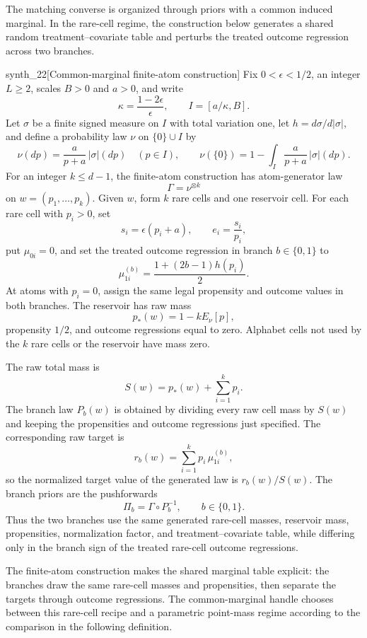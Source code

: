\documentclass[11pt]{article}
\begin{document}
The matching converse is organized through priors with a common induced marginal. In the rare-cell regime, the construction below generates a shared random treatment--covariate table and perturbs the treated outcome regression across two branches.

\begin{definitionv}{synth_22}[Common-marginal finite-atom construction]
Fix \(0<\epsilon<1/2\), an integer \(L\ge2\), scales \(B>0\) and \(a>0\), and write
\[
\kappa=\frac{1-2\epsilon}{\epsilon},\qquad I=[a/\kappa,B].
\]
Let \(\sigma\) be a finite signed measure on \(I\) with total variation one, let
\(h=d\sigma/d|\sigma|\), and define a probability law \(\nu\) on \(\{0\}\cup I\) by
\[
\nu(dp)=\frac{a}{p+a}\,|\sigma|(dp)\quad(p\in I),
\qquad
\nu(\{0\})=1-\int_I\frac{a}{p+a}\,|\sigma|(dp).
\]
For an integer \(k\le d-1\), the finite-atom construction has atom-generator law
\[
\Gamma=\nu^{\otimes k}
\]
on \(w=(p_1,\ldots,p_k)\).  Given \(w\), form \(k\) rare cells and one reservoir cell.  For each rare cell with \(p_i>0\), set
\[
s_i=\epsilon(p_i+a),\qquad e_i=\frac{s_i}{p_i},
\]
put \(\mu_{0i}=0\), and set the treated outcome regression in branch \(b\in\{0,1\}\) to
\[
\mu_{1i}^{(b)}=\frac{1+(2b-1)h(p_i)}{2}.
\]
At atoms with \(p_i=0\), assign the same legal propensity and outcome values in both branches.  The reservoir has raw mass
\[
p_*(w)=1-kE_\nu[p],
\]
propensity \(1/2\), and outcome regressions equal to zero.  Alphabet cells not used by the \(k\) rare cells or the reservoir have mass zero.

The raw total mass is
\[
S(w)=p_*(w)+\sum_{i=1}^k p_i.
\]
The branch law \(P_b(w)\) is obtained by dividing every raw cell mass by \(S(w)\) and keeping the propensities and outcome regressions just specified.  The corresponding raw target is
\[
r_b(w)=\sum_{i=1}^k p_i\,\mu_{1i}^{(b)},
\]
so the normalized target value of the generated law is \(r_b(w)/S(w)\).  The branch priors are the pushforwards
\[
\Pi_b=\Gamma\circ P_b^{-1},\qquad b\in\{0,1\}.
\]
Thus the two branches use the same generated rare-cell masses, reservoir mass, propensities, normalization factor, and treatment--covariate table, while differing only in the branch sign of the treated rare-cell outcome regressions.
\end{definitionv}

The finite-atom construction makes the shared marginal table explicit: the branches draw the same rare-cell masses and propensities, then separate the targets through outcome regressions. The common-marginal handle chooses between this rare-cell recipe and a parametric point-mass regime according to the comparison in the following definition.
\end{document}
